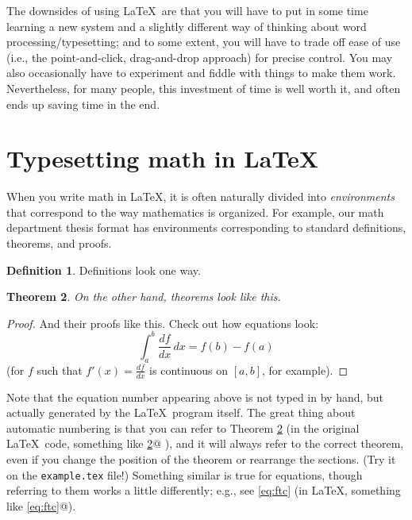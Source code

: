 \documentclass[modernstyle,12pt]{sjsuthesis}
\newtheorem{thm}{Theorem}[section]
\theoremstyle{definition}
\newtheorem{defn}[thm]{Definition}
\begin{document}
The downsides of using \LaTeX\ are that you will have to put in some
time learning a new system and a slightly different way of thinking
about word processing/typesetting; and to some extent, you will have
to trade off ease of use (i.e., the point-and-click, drag-and-drop
approach) for precise control.  You may also occasionally have to
experiment and fiddle with things to make them work.  Nevertheless,
for many people, this investment of time is well worth it, and often
ends up saving time in the end.



\section{Typesetting math in \LaTeX}
\label{sect:latex-math}

When you write math in \LaTeX, it is often naturally divided into {\it
  environments\/} that correspond to the way mathematics is organized.
For example, our math department thesis format has environments
corresponding to standard definitions, theorems, and proofs.

\begin{defn}
Definitions look one way.
\end{defn}

\begin{thm}\label{thm:sample}
On the other hand, theorems look like this.
\end{thm}

\begin{proof}
And their proofs like this.  Check out how equations look:
\begin{equation}\label{eq:ftc}
\int_a^b \dfrac{df}{dx} \,dx = f(b)-f(a)
\end{equation}
(for $f$ such that $f'(x)=\frac{df}{dx}$ is continuous on $[a,b]$, for
example).
\end{proof}

Note that the equation number appearing above is not typed in by hand,
but actually generated by the \LaTeX\ program itself.  The great thing
about automatic numbering is that you can refer to Theorem
\ref{thm:sample} (in the original \LaTeX\ code, something like
%
\verb@Theorem \ref{thm:sample}@%
%
), and it will always refer to the correct theorem, even if you change
the position of the theorem or rearrange the sections.  (Try it on the
{\tt example.tex\/} file!)  Something similar is true for equations,
though referring to them works a little differently; e.g., see
\eqref{eq:ftc} (in \LaTeX, something like \verb@\eqref{eq:ftc}@).
\end{document}
